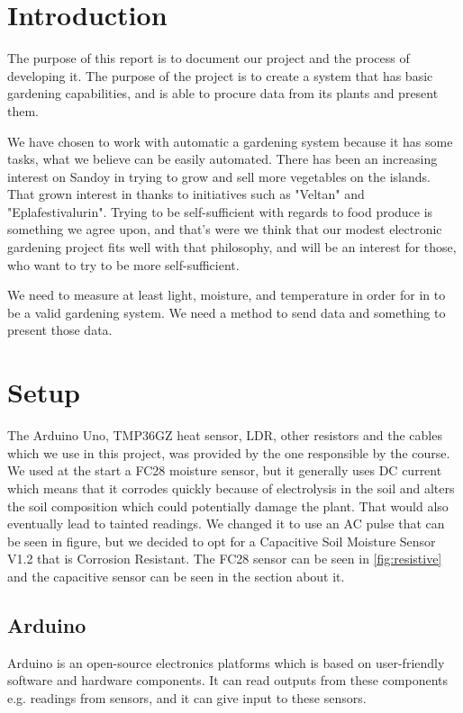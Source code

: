 \documentclass[a4paper,12pt,twoside,openright,titlepage]{book}
\begin{document}
\mainmatter
\chapter{Introduction}

The purpose of this report is to document our project and the process of developing it. The purpose of the project is to create a system that has basic gardening capabilities, and is able to procure data from its plants and present them.

We have chosen to work with automatic a gardening system because it has some tasks, what we believe can be easily automated. There has been an increasing interest on Sandoy in trying to grow and sell more vegetables on the islands. That grown interest in thanks to initiatives such as "Veltan" and "Eplafestivalurin". Trying to be self-sufficient with regards to food produce is something we agree upon, and that's were we think that our modest electronic gardening project fits well with that philosophy, and will be an interest for those, who want to try to be more self-sufficient.

We need to measure at least light, moisture, and temperature in order for in to be a valid gardening system. We need a method to send data and something to present those data.

\chapter{Setup}
The Arduino Uno, TMP36GZ heat sensor, LDR, other resistors and the cables which we use in this project, was provided by the one responsible by the course. We used at the start a FC28 moisture sensor, but it generally uses DC current which means that it corrodes quickly because of electrolysis in the soil and alters the soil composition which could potentially damage the plant. That would also eventually lead to tainted readings. We changed it to use an AC pulse that can be seen in figure, but we decided to opt for a Capacitive Soil Moisture Sensor V1.2 that is Corrosion Resistant. The FC28 sensor can be seen in \ref{fig:resistive} and the capacitive sensor can be seen in the section about it.

\section{Arduino}
Arduino is an open-source electronics platforms which is based on user-friendly software and hardware components\cite{ArduinoIntroduction}. It can read outputs from these components e.g. readings from sensors, and it can give input to these sensors.
\end{document}
